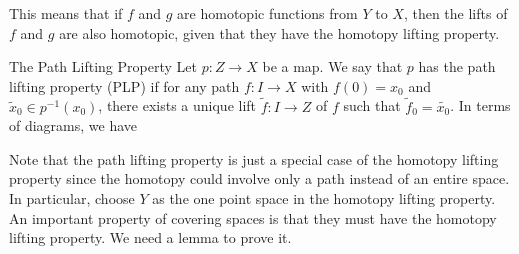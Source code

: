 \documentclass[a4paper]{article}
\begin{document}
This means that if $f$ and $g$ are homotopic functions from $Y$ to $X$, then the lifts of $f$ and $g$ are also homotopic, given that they have the homotopy lifting property. 

\begin{defn}{The Path Lifting Property}{} Let $p:Z\to X$ be a map. We say that $p$ has the path lifting property (PLP) if for any path $f:I\to X$ with $f(0)=x_0$ and $\widetilde{x}_0\in p^{-1}(x_0)$, there exists a unique lift $\widetilde{f}:I\to Z$ of $f$ such that $\widetilde{f}_0=\widetilde{x_0}$. In terms of diagrams, we have \\
\end{defn}

Note that the path lifting property is just a special case of the homotopy lifting property since the homotopy could involve only a path instead of an entire space. In particular, choose $Y$ as the one point space in the homotopy lifting property. \\

An important property of covering spaces is that they must have the homotopy lifting property. We need a lemma to prove it. 
\end{document}
